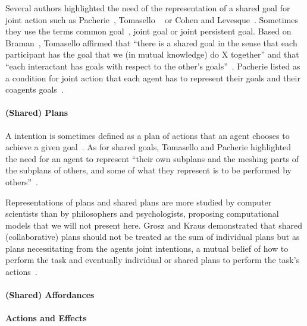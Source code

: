 \documentclass[a4paper,11pt,twoside]{StyleThese}
\begin{document}
Several authors highlighted the need of the representation of a shared goal for joint action such as Pacherie~\cite{pacherie_2012_agency}, Tomasello \etal{}~\cite{tomasello_2005_understanding} or Cohen and Levesque~\cite{cohen_1991_teamwork}. Sometimes they use the terms  common goal~\cite{searle_1990_collective}, joint goal or joint persistent goal.
Based on Braman~\cite{bratman_1992_coop}, Tomasello \etal{} affirmed that ``there is a shared goal in the sense that each participant has the goal that we (in mutual knowledge) do X together'' and that ``each interactant has goals with respect to the other’s goals''~\cite{tomasello_2005_understanding}. Pacherie listed as a condition for joint action that each agent has to represent their goals and their coagents goals~\cite{pacherie_2012_agency}.

\paragraph{(Shared) Plans}
A intention is sometimes defined as a plan of actions that an agent chooses to achieve a given goal~\cite{tomasello_2005_understanding, kaplan_2006_challenges}. 
As for shared goals, Tomasello \etal{} and Pacherie highlighted the need for an agent to represent ``their own subplans and the meshing parts of the subplans of others, and some of what they represent is to be performed by others''~\cite[p.~353]{pacherie_2012_agency}.

Representations of plans and shared plans are more studied by computer scientists than by philosophers and psychologists, proposing computational models that we will not present here. Grosz and Kraus demonstrated that shared (collaborative) plans should not be treated as the sum of individual plans but as plans necessitating from the agents joint intentions, a mutual belief of how to perform the task and eventually individual or shared plans to perform the task's actions~\cite{grosz_1996_collaborative}.

\paragraph{(Shared) Affordances}

\paragraph{Actions and Effects}
\end{document}

